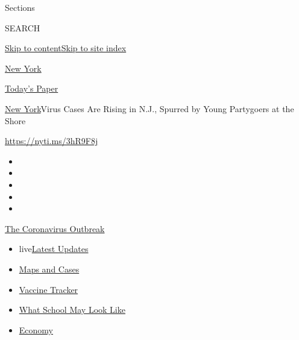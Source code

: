 Sections

SEARCH

\protect\hyperlink{site-content}{Skip to
content}\protect\hyperlink{site-index}{Skip to site index}

\href{https://www.nytimes.com/section/nyregion}{New York}

\href{https://myaccount.nytimes.com/auth/login?response_type=cookie\&client_id=vi}{}

\href{https://www.nytimes.com/section/todayspaper}{Today's Paper}

\href{/section/nyregion}{New York}\textbar{}Virus Cases Are Rising in
N.J., Spurred by Young Partygoers at the Shore

\url{https://nyti.ms/3hR9F8j}

\begin{itemize}
\item
\item
\item
\item
\item
\end{itemize}

\href{https://www.nytimes.com/news-event/coronavirus?action=click\&pgtype=Article\&state=default\&region=TOP_BANNER\&context=storylines_menu}{The
Coronavirus Outbreak}

\begin{itemize}
\tightlist
\item
  live\href{https://www.nytimes.com/2020/08/01/world/coronavirus-covid-19.html?action=click\&pgtype=Article\&state=default\&region=TOP_BANNER\&context=storylines_menu}{Latest
  Updates}
\item
  \href{https://www.nytimes.com/interactive/2020/us/coronavirus-us-cases.html?action=click\&pgtype=Article\&state=default\&region=TOP_BANNER\&context=storylines_menu}{Maps
  and Cases}
\item
  \href{https://www.nytimes.com/interactive/2020/science/coronavirus-vaccine-tracker.html?action=click\&pgtype=Article\&state=default\&region=TOP_BANNER\&context=storylines_menu}{Vaccine
  Tracker}
\item
  \href{https://www.nytimes.com/interactive/2020/07/29/us/schools-reopening-coronavirus.html?action=click\&pgtype=Article\&state=default\&region=TOP_BANNER\&context=storylines_menu}{What
  School May Look Like}
\item
  \href{https://www.nytimes.com/live/2020/07/31/business/stock-market-today-coronavirus?action=click\&pgtype=Article\&state=default\&region=TOP_BANNER\&context=storylines_menu}{Economy}
\end{itemize}

